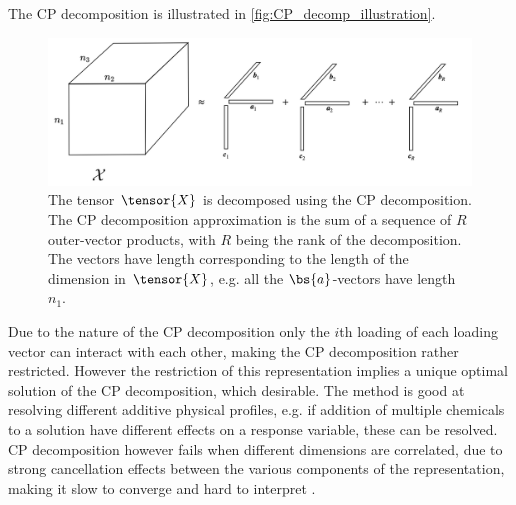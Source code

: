The CP decomposition is illustrated in \autoref{fig:CP_decomp_illustration}.
\begin{figure}
    \centering
    \captionsetup{width=.95\linewidth}
    \includegraphics[width=\linewidth]{Pics/02_Theory/CP_decomp_illustration.png}
    \caption{The tensor $\tensor{X}$ is decomposed using the CP decomposition. The CP decomposition approximation is the sum of a sequence of $R$ outer-vector products, with $R$ being the rank of the decomposition. The vectors have length corresponding to the length of the dimension in $\tensor{X}$, e.g. all the $\bs{a}$-vectors have length $n_1$.}
    \label{fig:CP_decomp_illustration}
\end{figure}

Due to the nature of the CP decomposition only the $i$th loading of each loading vector can interact with each other, making the CP decomposition rather restricted. However the restriction of this representation implies a unique optimal solution of the CP decomposition, which desirable. The method is good at resolving different additive physical profiles, e.g. if addition of multiple chemicals to a solution have different effects on a response variable, these can be resolved. CP decomposition however fails when different dimensions are correlated, due to strong cancellation effects between the various components of the representation, making it slow to converge and hard to interpret \cite{Mørup2011}.

